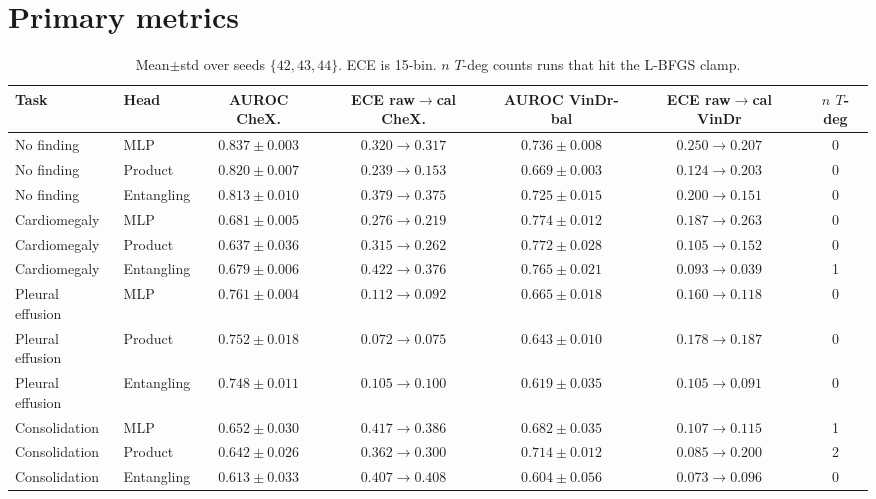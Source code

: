 \documentclass[11pt,a4paper]{article}
\begin{document}
\section{Primary metrics}
\label{tab:primary}
\begin{table}[h]
\centering
\scriptsize
\caption{Mean$\pm$std over seeds $\{42,43,44\}$. ECE is 15-bin. $n$ $T$-deg counts runs that hit the L-BFGS clamp.}
\begin{tabular}{llccccc}
\toprule
Task & Head & AUROC CheX. & ECE raw$\to$cal CheX. & AUROC VinDr-bal & ECE raw$\to$cal VinDr & $n$ $T$-deg \\
\midrule
No finding & MLP & $0.837\pm0.003$ & $0.320\to0.317$ & $0.736\pm0.008$ & $0.250\to0.207$ & 0 \\
No finding & Product & $0.820\pm0.007$ & $0.239\to0.153$ & $0.669\pm0.003$ & $0.124\to0.203$ & 0 \\
No finding & Entangling & $0.813\pm0.010$ & $0.379\to0.375$ & $0.725\pm0.015$ & $0.200\to0.151$ & 0 \\
Cardiomegaly & MLP & $0.681\pm0.005$ & $0.276\to0.219$ & $0.774\pm0.012$ & $0.187\to0.263$ & 0 \\
Cardiomegaly & Product & $0.637\pm0.036$ & $0.315\to0.262$ & $0.772\pm0.028$ & $0.105\to0.152$ & 0 \\
Cardiomegaly & Entangling & $0.679\pm0.006$ & $0.422\to0.376$ & $0.765\pm0.021$ & $0.093\to0.039$ & 1 \\
Pleural effusion & MLP & $0.761\pm0.004$ & $0.112\to0.092$ & $0.665\pm0.018$ & $0.160\to0.118$ & 0 \\
Pleural effusion & Product & $0.752\pm0.018$ & $0.072\to0.075$ & $0.643\pm0.010$ & $0.178\to0.187$ & 0 \\
Pleural effusion & Entangling & $0.748\pm0.011$ & $0.105\to0.100$ & $0.619\pm0.035$ & $0.105\to0.091$ & 0 \\
Consolidation & MLP & $0.652\pm0.030$ & $0.417\to0.386$ & $0.682\pm0.035$ & $0.107\to0.115$ & 1 \\
Consolidation & Product & $0.642\pm0.026$ & $0.362\to0.300$ & $0.714\pm0.012$ & $0.085\to0.200$ & 2 \\
Consolidation & Entangling & $0.613\pm0.033$ & $0.407\to0.408$ & $0.604\pm0.056$ & $0.073\to0.096$ & 0 \\
\bottomrule
\end{tabular}
\end{table}
\end{document}
